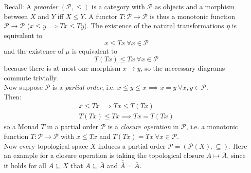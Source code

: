 \begin{example}[preorder]
    Recall: A \textit{preorder} $(\mathcal{P},\le)$ is a category with $\mathcal{P}$ as objects and 
    a morphism between $X$ and $Y$ iff $X \le Y$.
A functor $T\colon \mathcal{P} \to \mathcal{P}$ is thus a monotonic function $\mathcal{P}\to \mathcal{P}$
($x \le y \implies Tx\le Ty$).
The existence of the natural transformations $\eta$ is equivalent to
\[x \le Tx \ \forall x \in \mathcal{P}\]
and the existence of $\mu$ is equivalent to
\[T(Tx) \le Tx \ \forall x \in \mathcal{P}\] 
because there is at most one morphism $x \to y$, so the neccessary diagrams commute trivially.\\
Now suppose $\mathcal{P}$ is a \textit{partial order}, i.e. $x \le y \le x \implies x = y \ \forall x,y \in \mathcal{P}$. \\
Then:
\begin{align*}
    x \le Tx \implies Tx \le T(Tx) \\
    T(Tx) \le Tx \implies Tx = T(Tx)
\end{align*}
so a Monad $T$ in a partial order $\mathcal{P}$ is a \textit{closure operation} in $\mathcal{P}$, i.e. 
a monotonic function $T \colon \mathcal{P} \to \mathcal{P}$ 
with $x \le Tx$ and $T(Tx)=Tx \ \forall x \in \mathcal{P}.$ \\
Now every topological space $X$ induces a partial order $\mathcal{P} = (\mathscr{P}(X),\subseteq)$.
Here an example for a closure operation is taking the topological closure $A \mapsto \overline{A}$,
since it holds for all $A \subseteq X$ that $A \subseteq \overline{A}$ and
$\overline{\overline{A}} = \overline{A}$.
\end{example}

